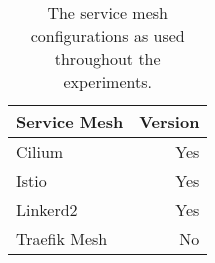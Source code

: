 \begin{table*}[t]
\centering

\begin{tabular}{l r}

    \toprule
    Service Mesh       & Version \\
    \toprule
    
    Cilium             & Yes  \\
    Istio              & Yes  \\
    Linkerd2           & Yes  \\
    Traefik Mesh       & No   \\
    \bottomrule
    
\end{tabular}

\caption{The service mesh configurations as used throughout the experiments.}
\label{tab:experiment:design:mesh}
\end{table*}

